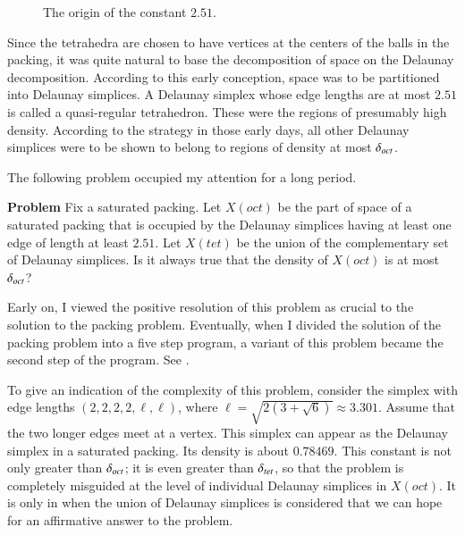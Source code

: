 \begin{figure}[htb]
  \centering
  \caption{The origin of the constant $2.51$.}
  \label{fig:t51}
\end{figure}

Since the tetrahedra are chosen to have vertices at the centers of
the balls in the packing, it was quite natural to base the
decomposition of space on the Delaunay decomposition. According to
this early conception, space was to be partitioned into Delaunay
simplices.  A Delaunay simplex whose edge lengths are at most
$2.51$ is called a quasi-regular tetrahedron.  These were the
regions of presumably high density.  According to the strategy in
those early days, all other Delaunay simplices were to be shown to
belong to regions of density at most $\delta_{oct}$.

The following problem occupied my attention for a long period.


\smallskip\noindent
{\bf Problem} Fix a saturated packing. Let $X(oct)$ be the part of
space of a saturated packing that is occupied by the Delaunay
simplices having at least one edge of length at least $2.51$.  Let
$X(tet)$ be the union of the complementary set of Delaunay
simplices.  Is it always true that the density of $X(oct)$ is at
most $\delta_{oct}$?

Early on, I viewed the positive resolution of this problem as
crucial to the solution to the packing problem.  Eventually,
when I divided the solution of the packing problem into a five step
program, a variant of this problem became the second step of the
program. See \cite{part2}.

To give an indication of the complexity of this problem, consider
the simplex with edge lengths $(2,2,2,2,\ell,\ell)$, where $\ell =
\sqrt{2 (3 + \sqrt6)}\approx 3.301$.  Assume that the two longer
edges meet at a vertex.  This simplex can appear as the Delaunay
simplex in a saturated packing.  Its density is about $0.78469$.
This constant is not only greater than $\delta_{oct}$; it is even greater
than $\delta_{tet}$, so that the problem is completely misguided at the
level of individual Delaunay simplices in $X(oct)$.  It is only in
when the union of Delaunay simplices is considered that we can
hope for an affirmative answer to the problem.

